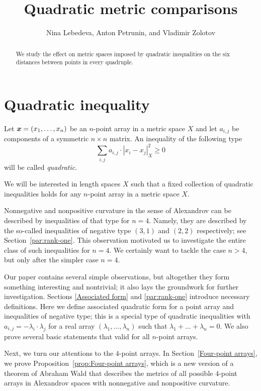 \documentclass[a4paper,10pt]{article}
\def\thetitle{Quadratic metric comparisons}
\def\theauthors{Nina Lebedeva, Anton Petrunin, and Vladimir Zolotov}
\begin{document}


\title{\thetitle}
\author{\theauthors}
\date{}
\maketitle

\begin{abstract}
We study the effect on metric spaces imposed by quadratic inequalities on the six distances between points in every quadruple.
\end{abstract}

\section{Quadratic inequality}\label{par:quadratic-inq}

Let $\bm{x}\z=(x_1,\dots,x_n)$ be an $n$-point array in a metric space $X$ and let $a_{i,j}$ be components of a symmetric $n{\times}n$ matrix.
An inequality of the following type
\[\sum_{i,j}a_{i,j}\cdot|x_i-x_j|_X^2\ge 0\]
will be called \emph{quadratic}.

We will be interested in length spaces $X$ such that a fixed collection of quadratic inequalities holds for any $n$-point array in a metric space $X$.

Nonnegative and nonpositive curvature in the sense of Alexandrov can be described by inequalities of that type for $n=4$.
Namely, they are described by the so-called inequalities of negative type $(3,1)$ and $(2,2)$ respectively; see Section~\ref{par:rank-one}.
This observation motivated us to investigate the entire class of such inequalities for $n=4$.
We certainly want to tackle the case $n>4$, but only after the simpler case $n=4$.

Our paper contains several simple observations, but altogether they form something interesting and nontrivial; it also lays the groundwork for further investigation.
Sections \ref{Associated form} and \ref{par:rank-one} introduce necessary definitions.
Here we define associated quadratic form for a point array and inequalities of negative type;
this is a special type of quadratic inequalities with $a_{i,j}=-\lambda_i\cdot\lambda_j$ for a real array $(\lambda_1,\dots, \lambda_n)$ such that $\lambda_1+\dots+\lambda_n=0$.
We also prove several basic statements that valid for all $n$-point arrays.

Next, we turn our attentions to the $4$-point arrays.
In Section~\ref{Four-point arrays}, we prove Proposition~\ref{prop:Four-point arrays}, which is a new version of a theorem of Abraham Wald \cite[§ 7]{wald} that describes the metrics of all possible 4-point arrays in Alexandrov spaces with nonnegative and nonpositive curvature.
\end{document}
